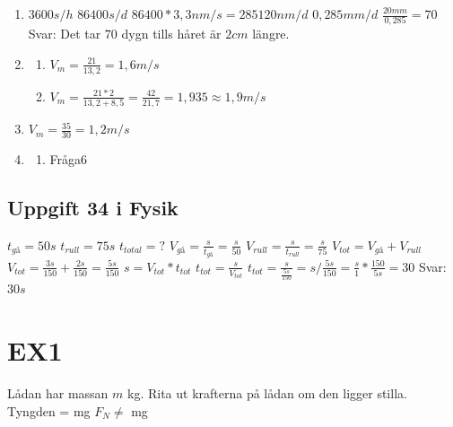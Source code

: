 \documentclass[a4paper,11pt]{article}
\begin{document}
\begin{flushleft}
\begin{enumerate}
  \item $ 3600s/h $\newline
  $ 86400s/d $\newline
  $ 86400*3,3nm/s=285120nm/d $\newline
  $ 0,285mm/d $\newline
  $ \frac{20mm}{0,285}=70 $\newline
  Svar: Det tar 70 dygn tills håret är $2cm$ längre.
  \item \begin{enumerate}
    \item $ V_m=\frac{21}{13,2}=1,6m/s $\newline
    \item $ V_m=\frac{21*2}{13,2+8,5}=\frac{42}{21,7}=1,935\approx1,9m/s $\newline
  \end{enumerate}
  \item $ V_m=\frac{35}{30}=1,2m/s $
  \item \begin{enumerate}
    \item Fråga6
  \end{enumerate}
\end{enumerate}
\newpage
\subsection{Uppgift 34 i Fysik}
$ t_{gå}=50s $\newline
$ t_{rull}=75s $\newline
$ t_{total}=?$\newline
$ V_{gå}=\frac{s}{t_{gå}}=\frac{s}{50} $\newline
$ V_{rull}=\frac{s}{t_{rull}}=\frac{s}{75} $\newline
$ V_{tot}=V_{gå}+V_{rull} $\newline
$ V_{tot}=\frac{3s}{150}+\frac{2s}{150}=\frac{5s}{150} $\newline
$ s=V_{tot}*t_{tot} $\newline
$ t_{tot}=\frac{s}{V_{tot}} $\newline
$ t_{tot}=\frac{s}{\frac{5s}{150}}=s/\frac{5s}{150}=\frac{s}{1}*\frac{150}{5s}=30 $\newline
Svar: $30s$
\section{EX1}
Lådan har massan $m$ kg.
Rita ut krafterna på lådan om den ligger stilla.\newline
Tyngden = mg\newline
$ F_N  \neq $ mg

\end{flushleft}
\end{document}
